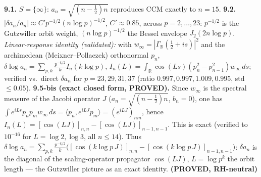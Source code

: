 \documentclass[11pt]{amsart}
\theoremstyle{definition}
\theoremstyle{remark}
\begin{document}
\textbf{9.1.} $S=\{\infty\}$: $a_n=\sqrt{(n-\tfrac12)n}$ reproduces CCM exactly to $n=15$.
\textbf{9.2.} $|\delta a_n/a_n|\approx C'p^{-1/2}(n\log p)^{-1/2}$, $C'\approx0.85$, across
$p=2,\dots,23$: $p^{-1/2}$ is the Gutzwiller orbit weight, $(n\log p)^{-1/2}$ the Bessel envelope
$J_2(2n\log p)$. \emph{Linear-response identity (validated):} with $w_\infty=|\Gamma_{\mathbb
R}(\tfrac12+is)|^2$ and the archimedean (Meixner--Pollaczek) orthonormal $p_n$,
$\delta\log a_n=\sum_{p,k}\tfrac{p^{-k/2}}{k}I_n(k\log p)$,
$I_n(L)=\int_{\mathbb R}\cos(Ls)(p_n^2-p_{n-1}^2)w_\infty\,ds$; verified vs.\ direct $\delta a_n$ for
$p=23,29,31,37$ (ratio $0.997,0.997,1.009,0.995$, std $\le0.05$).
\textbf{9.5-bis (exact closed form, PROVED).} Since $w_\infty$ is the spectral measure of the
Jacobi operator $J$ ($a_n=\sqrt{(n-\tfrac12)n}$, $b_n=0$), one has
$\int e^{iLs}p_np_m w_\infty\,ds=\langle p_n,e^{iLJ}p_m\rangle=(e^{iLJ})_{nm}$, hence
$\boxed{I_n(L)=[\cos(LJ)]_{n,n}-[\cos(LJ)]_{n-1,n-1}}$. This is exact (verified to $10^{-16}$ for
$L=\log2,\log3$, all $n\le14$). Thus
$\delta\log a_n=\sum_{p,k}\tfrac{p^{-k/2}}{k}\bigl([\cos(k\log p\,J)]_{n,n}-[\cos(k\log
p\,J)]_{n-1,n-1}\bigr)$: $\delta a_n$ is the diagonal of the scaling-operator propagator
$\cos(LJ)$, $L=\log p^k$ the orbit length --- the Gutzwiller picture as an exact identity.
\textbf{(PROVED, RH-neutral)}
\end{document}
